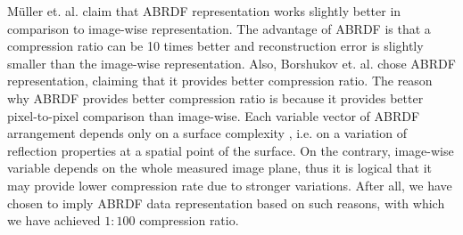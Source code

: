  
M{\"u}ller et. al. \cite{mueller-2003-compression, haindl} claim that ABRDF representation works slightly better in comparison to image-wise representation. 
The advantage of ABRDF is that a compression ratio can be 10 times better and reconstruction error is slightly smaller than the image-wise representation.
Also, Borshukov et. al. \cite[Ch.\ 15]{gpu_gems} chose ABRDF representation, claiming that it provides better compression ratio.
The reason why ABRDF provides better compression ratio is because it provides better pixel-to-pixel comparison than image-wise. 
Each variable vector of ABRDF arrangement depends only on a surface complexity \cite{mueller-2003-compression}, i.e. 
on a variation of reflection properties at a spatial point of the surface.
On the contrary, image-wise variable depends on the whole measured image plane, thus it is logical that it may provide lower compression rate due to stronger variations.
After all, we have chosen to imply ABRDF data representation based on such reasons, with which we have achieved $1:100$ compression ratio. 
